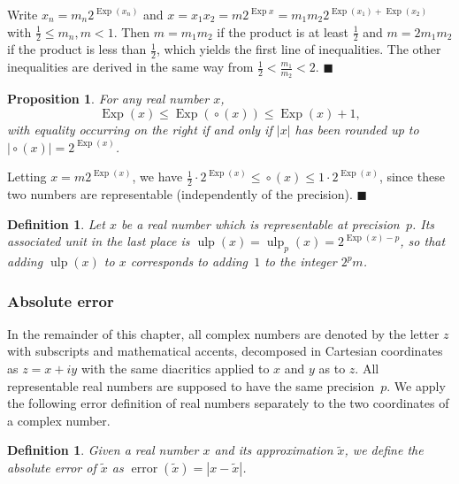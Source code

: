 \documentclass [11pt]{article}
\newcommand {\corr}[1]{{#1}}
\newcommand {\appro}[1]{\widetilde {#1}}
\newcommand {\Ulp}{{\operatorname {ulp}}}
\DeclareMathOperator{\Exp}{\operatorname {Exp}}
\newcommand{\error}{\operatorname {error}}
\newcommand {\round}{\operatorname {\circ}}
\renewcommand {\leq}{\leqslant}
\newtheorem{definition}[theorem]{Definition}
\newtheorem{prop}[theorem]{Proposition}
\newenvironment{proof}{\noindent{\bf Proof:}}{{\hspace* {\fill}$\blacksquare$}}
\begin{document}
\begin {proof}
Write $x_n = m_n 2^{\Exp (x_n)}$ and
$x = x_1 x_2 = m 2^{\Exp x} = m_1 m_2 2^{\Exp (x_1) + \Exp (x_2)}$
with $\frac {1}{2} \leq m_n, m < 1$.
Then $m = m_1 m_2$ if the product is at least $\frac {1}{2}$ and
$m = 2 m_1 m_2$ if the product is less than $\frac {1}{2}$, which
yields the first line of inequalities.
The other inequalities are derived in the same way from
$\frac {1}{2} < \frac {m_1}{m_2} < 2$.
\end {proof}


\begin {prop}
\label {prop:expround}
For any real number $x$,
\[
\Exp (x) \leq \Exp (\round (x)) \leq \Exp (x) + 1,
\]
with equality occurring on the right if and only if
$|x|$ has been rounded up to $|\round (x)| = 2^{\Exp (x)}$.
\end {prop}

\begin {proof}
Letting $x = m 2^{\Exp (x)}$, we have
$\frac {1}{2} \cdot 2^{\Exp (x)} \leq \round (x) \leq 1 \cdot 2^{\Exp (x)}$,
since these two numbers are representable (independently of the precision).
\end {proof}


\begin {definition}
\label {def:ulp}
Let $x$ be a real number which is representable at precision~$p$.
Its associated {\em unit in the last place} is
$\Ulp(x) = \Ulp_p (x) = 2^{\Exp(x) - p}$, so that adding $\Ulp(x)$ to $x$
corresponds to adding~$1$ to the integer $2^p m$.
\end {definition}


\subsubsection {Absolute error}

In the remainder of this chapter, all complex numbers are denoted by
the letter $z$ with subscripts and mathematical accents, decomposed in
Cartesian coordinates as $z = x + i y$ with the same diacritics applied
to $x$ and $y$ as to $z$. All representable real numbers are supposed
to have the same precision~$p$. We apply the following error definition
of real numbers separately to the two coordinates of a complex number.

\begin {definition}
\label {def:error}
Given a real number $\corr x$ and its approximation $\appro x$,
we define the {\em absolute error} of $\appro x$ as
$\error (\appro x) = | \corr x - \appro x |$.
\end {definition}
\end{document}
